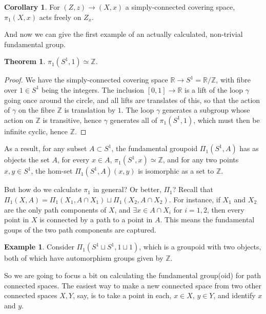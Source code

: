 \documentclass{tufte-handout}
\def\RR{\mathbb{R}}
\def\ZZ{\mathbb{Z}}
\theoremstyle{definition}
\newtheorem{example}{Example}
\newtheorem{theorem}{Theorem}
\newtheorem{corollary}{Corollary}
\begin{document}
\begin{corollary}
For $(Z,z)\to (X,x)$ a simply-connected covering space, $\pi_1(X,x)$ acts freely on $Z_x$.
\end{corollary}

And now we can give the first example of an actually calculated, non-trivial fundamental group.

\begin{theorem}
$\pi_1(S^1,1) \simeq \ZZ$.
\end{theorem}

\begin{proof}
We have the simply-connected covering space $\RR \to S^1 = \RR/\ZZ$, with fibre over 
$1\in S^1$ being the integers. The inclusion $[0,1]\to \RR$ is a lift of the loop $\gamma$ 
going once around the circle, and all lifts are translates of this, so that the action of 
$\gamma$ on the fibre $\ZZ$ is translation by $1$. The loop $\gamma$ generates a subgroup
whose action on $\ZZ$ is transitive, hence $\gamma$ generates all of $\pi_1(S^1,1)$,
which must then be infinite cyclic, hence $\ZZ$.
\end{proof}

As a result, for any subset $A\subset S^1$, the fundamental groupoid $\Pi_1(S^1,A)$ has as 
objects the set $A$, for every $x\in A$, $\pi_1(S^1,x) \simeq \ZZ$, and for any two points
$x,y\in S^1$, the hom-set $\Pi_1(S^1,A)(x,y)$ is isomorphic as a set to $\ZZ$.


But how do we calculate $\pi_1$ in general? Or better, $\Pi_1$? Recall that $\Pi_1(X,A) = \Pi_1(X_1,A\cap X_1) \sqcup
\Pi_1(X_2,A\cap X_2)$.
For instance, if $X_1$ and $X_2$ are the only path components of $X$, and 
$\exists x\in A\cap X_i$ for $i=1,2$, then every point in $X$ is connected by a path to a point
in $A$. This means the fundamental goups of the two path components are captured.

\begin{example}
Consider $\Pi_1(S^1\sqcup S^1,1\sqcup 1)$, which is a groupoid with two objects, both of which
have automorphism groups given by $\ZZ$.
\end{example}

So we are going to focus a bit on calculating the fundamental group(oid) for path 
connected spaces. The easiest way to make a new connected space from two other connected spaces $X,Y$, say, is to take a point in each, $x\in X$, $y\in Y$, and identify $x$ and $y$.
\end{document}
